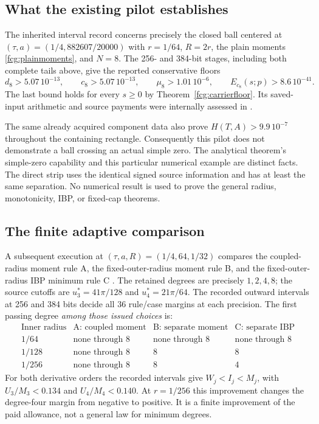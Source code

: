 \documentclass[11pt]{article}
\numberwithin{equation}{section}
\begin{document}
\subsection{What the existing pilot establishes}

The inherited interval record concerns precisely the closed ball
centered at
$(\tau,a)=(1/4,882607/20000)$ with $r=1/64$, $R=2r$, the plain
moments \eqref{fcg:plainmoments}, and $N=8$.
The 256- and 384-bit stages, including both complete tails above,
give the reported conservative floors
\[
 d_8>5.07\,10^{-13},\qquad c_8>5.07\,10^{-13},\qquad
 \mu_8>1.01\,10^{-6},\qquad E_{c_8}(s;p)>8.6\,10^{-41}.
\]
The last bound holds for every $s\ge0$ by
Theorem~\ref{fcg:carrierfloor}. Its saved-input arithmetic and source
payments were internally assessed in \cite{FCGPilot}.

The same already acquired component data also prove
$H(T,A)>9.9\,10^{-7}$ throughout the containing rectangle.
Consequently this pilot does not demonstrate a ball crossing an
actual simple zero. The analytical theorem's simple-zero capability
and this particular numerical example are distinct facts.
The direct strip uses the identical signed source information and
has at least the same separation. No numerical result is used to
prove the general radius, monotonicity, IBP, or fixed-cap theorems.

\subsection{The finite adaptive comparison}

A subsequent execution at $(\tau,a,R)=(1/4,64,1/32)$ compares the
coupled-radius moment rule A, the fixed-outer-radius moment rule B,
and the fixed-outer-radius IBP minimum rule C
\cite{FCGAdaptiveComparison}. The retained degrees are precisely
$1,2,4,8$; the source cutoffs are $u_3^*=41\pi/128$ and
$u_4^*=21\pi/64$. The recorded outward intervals at 256 and 384 bits
decide all 36 rule/case margins at each precision. The first passing
degree \emph{among those issued choices} is:
\[
 \begin{array}{c|ccc}
 \text{Inner radius}&\text{A: coupled moment}
       &\text{B: separate moment}&\text{C: separate IBP}\\ \hline
 1/64&\text{none through 8}&\text{none through 8}&\text{none through 8}\\
 1/128&\text{none through 8}&8&8\\
 1/256&\text{none through 8}&8&4
 \end{array}
\]
For both derivative orders the recorded intervals give $W_j<I_j<M_j$,
with $U_3/M_3<0.134$ and $U_4/M_4<0.140$.
At $r=1/256$ this improvement changes the degree-four margin from
negative to positive. It is a finite improvement of the paid allowance,
not a general law for minimum degrees.
\end{document}
